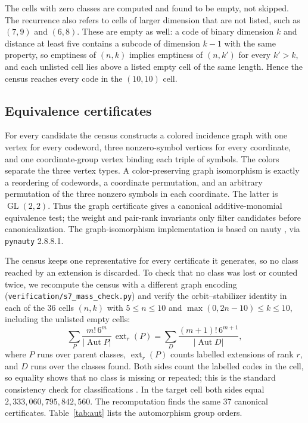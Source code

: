 \documentclass[11pt]{article}
\begin{document}
The cells with zero classes are computed and found to be empty, not skipped. The recurrence also refers to cells of larger dimension that are not listed, such as \((7,9)\) and \((6,8)\). These are empty as well: a code of binary dimension \(k\) and distance at least five contains a subcode of dimension \(k-1\) with the same property, so emptiness of \((n,k)\) implies emptiness of \((n,k')\) for every \(k'>k\), and each unlisted cell lies above a listed empty cell of the same length. Hence the census reaches every code in the \((10,10)\) cell.

\subsection{Equivalence certificates}\label{equivalence-certificates}

For every candidate the census constructs a colored incidence graph with one vertex for every codeword, three nonzero-symbol vertices for every coordinate, and one coordinate-group vertex binding each triple of symbols. The colors separate the three vertex types. A color-preserving graph isomorphism is exactly a reordering of codewords, a coordinate permutation, and an arbitrary permutation of the three nonzero symbols in each coordinate. The latter is \(\operatorname{GL}(2,2)\). Thus the graph certificate gives a canonical additive-monomial equivalence test; the weight and pair-rank invariants only filter candidates before canonicalization. The graph-isomorphism implementation is based on nauty \cite{mckay-piperno}, via \texttt{pynauty} 2.8.8.1.

The census keeps one representative for every certificate it generates, so no class reached by an extension is discarded. To check that no class was lost or counted twice, we recompute the census with a different graph encoding (\texttt{verification/s7\_mass\_check.py}) and verify the orbit--stabilizer identity in each of the 36 cells \((n,k)\) with \(5\leq n\leq10\) and \(\max(0,2n-10)\leq k\leq10\), including the unlisted empty cells:
\[
\sum_{P}\frac{m!\,6^{m}}{\lvert\operatorname{Aut}P\rvert}\,\operatorname{ext}_r(P)
=\sum_{D}\frac{(m+1)!\,6^{m+1}}{\lvert\operatorname{Aut}D\rvert},
\]
where \(P\) runs over parent classes, \(\operatorname{ext}_r(P)\) counts labelled extensions of rank \(r\), and \(D\) runs over the classes found. Both sides count the labelled codes in the cell, so equality shows that no class is missing or repeated; this is the standard consistency check for classifications \cite{kaski-ostergard}. In the target cell both sides equal \(2{,}333{,}060{,}795{,}842{,}560\). The recomputation finds the same 37 canonical certificates. Table~\ref{tab:aut} lists the automorphism group orders.
\end{document}
